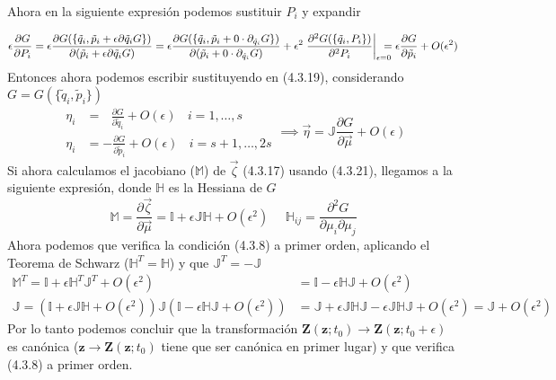 \vspace{-30pt}
Ahora en la siguiente expresión podemos sustituir $P_i$ y expandir

\vspace{-15pt}
\begin{equation} \label{4.2.7}
        \epsilon \frac{\partial G}{\partial P_i} = \epsilon \frac{\partial G (\{\tilde{q}_i,\tilde{p}_i + \epsilon \partial{\tilde{q}_i} G\})}{\partial (\tilde{p}_i + \epsilon \partial{\tilde{q}_i} G)} = \epsilon \frac{\partial G (\{\tilde{q}_i,\tilde{p}_i + 0 \cdot  \partial_{\tilde{q}_i} G\})}{\partial (\tilde{p}_i + 0 \cdot \partial_{\tilde{q}_i} G)} +\epsilon^2 \left.\frac{\partial^2 G (\{\tilde{q}_i,P_i\})}{\partial^2 P_i }\right|_{\epsilon=0} \hspace{-10pt}= \epsilon \frac{\partial G}{\partial \tilde{p}_i} + O(\epsilon^2)
\end{equation} 
Entonces ahora podemos escribir sustituyendo en (4.3.19), considerando $G = G(\{\tilde{q}_i,\tilde{p}_i\})$
\begin{equation} \label{4.2.7}
    \begin{split}
        \eta_i &= \ \ \ \frac{\partial G}{\partial \tilde{q}_i} +O(\epsilon) \ \ \ \ i = 1,\dots,s\\ 
        \eta_i &= -\frac{\partial G}{\partial \tilde{p}_i} +O(\epsilon) \ \ \ \ i = s+1,\dots,2s
    \end{split} \implies \vec{\eta} = \mathbb{J} \frac{\partial G}{\partial \vec{\mu}} +O(\epsilon)
\end{equation} 
Si ahora calculamos el jacobiano ($\mathbb{M}$) de $\vec{\zeta}$ (4.3.17) usando (4.3.21), llegamos a la siguiente expresión, donde $\mathbb{H}$ es la Hessiana de $G$
\begin{equation} \label{4.2.7}
    \mathbb{M} = \frac{\partial \vec{\zeta}}{\partial \vec{\mu}} = \mathbb{I} + \epsilon \mathbb{J} \mathbb{H} + O(\epsilon^2) \ \ \ \ \ \ \mathbb{H}_{ij} = \frac{\partial^2 G}{\partial \mu_i \partial \mu_j}
\end{equation} 
Ahora podemos que verifica la condición (4.3.8) a primer orden, aplicando el Teorema de Schwarz ($\mathbb{H}^T = \mathbb{H}$) y que $\mathbb{J}^T = -\mathbb{J}$
\begin{equation} \label{4.2.7}
    \begin{split}
        \mathbb{M}^T = \mathbb{I} + \epsilon \mathbb{H}^T \mathbb{J}^T  + O(\epsilon^2) &= \mathbb{I} - \epsilon \mathbb{H} \mathbb{J}  + O(\epsilon^2)\\ 
        \mathbb{J} = \left(\mathbb{I} + \epsilon  \mathbb{J}\mathbb{H} + O(\epsilon^2)\right) \mathbb{J} \left(\mathbb{I} - \epsilon \mathbb{H} \mathbb{J}  + O(\epsilon^2)\right) &= \mathbb{J} + \epsilon  \mathbb{J}\mathbb{H}\mathbb{J} -  \epsilon  \mathbb{J}\mathbb{H}\mathbb{J} + O(\epsilon^2) = \mathbb{J} + O(\epsilon^2)
    \end{split}
\end{equation} 
Por lo tanto podemos concluir que la transformación $\mathbf{Z}(\mathbf{z};t_0) \rightarrow \mathbf{Z}(\mathbf{z};t_0 + \epsilon)$ es canónica ($\mathbf{z} \rightarrow \mathbf{Z}(\mathbf{z};t_0)$ tiene que ser canónica en primer lugar) y que verifica (4.3.8) a primer orden.
